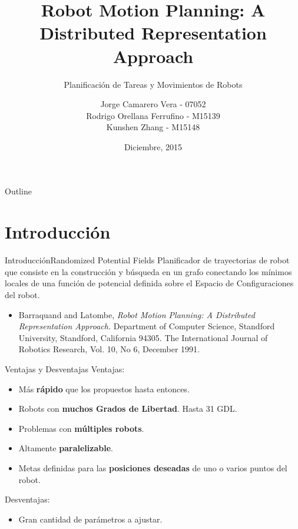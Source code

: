 \documentclass{beamer}
\title{Robot Motion Planning: A Distributed Representation Approach}
\subtitle{Planificación de Tareas y Movimientos de Robots}
\author{Jorge Camarero Vera - 07052\\ Rodrigo Orellana Ferrufino - M15139\\ Kunshen Zhang - M15148}
\institute[] %
{
  Máster en Automática y Robótica\\
  Universidad Politécnica de Madrid
}
\date{Diciembre, 2015}
\begin{document}
\begin{frame}
  \titlepage
\end{frame}

\begin{frame}{Outline}
  \tableofcontents
\end{frame}



\section{Introducción}
%

\begin{frame}{Introducción}{Randomized Potential Fields}
		Planificador de trayectorias de robot que consiste en
		la construcción y búsqueda en un grafo conectando los mínimos locales de una función de potencial
		definida sobre el Espacio de Configuraciones del robot.\\
		
		\bigskip
		
		\begin{itemize}
			\item  Barraquand and Latombe, \textit{Robot Motion Planning: A Distributed Representation Approach.} Department of Computer Science, Standford University, Standford, California 94305. The International Journal of Robotics Research, Vol. 10, No 6, December 1991.
		\end{itemize}
		
		
\end{frame}

\begin{frame}{Ventajas y Desventajas}
	Ventajas:
	\begin{itemize}
		\item Más \textbf{rápido} que los propuestos hasta entonces.
		\item Robots con \textbf{muchos Grados de Libertad}. Hasta 31 GDL.
		\item Problemas con \textbf{múltiples robots}.
		\item Altamente \textbf{paralelizable}.
		\item Metas definidas para las \textbf{posiciones deseadas} de uno o varios puntos del robot.
	\end{itemize}
	
	Desventajas:
	\begin{itemize}
		\item Gran cantidad de parámetros a ajustar.
	\end{itemize}
\end{frame}
\end{document}
